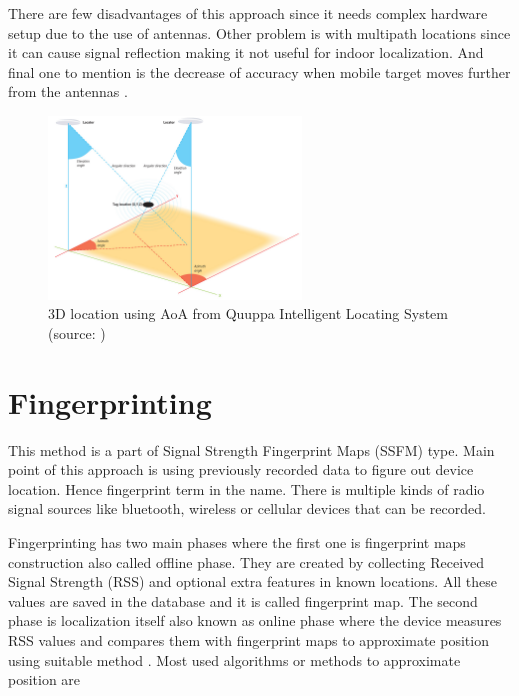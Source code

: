There are few disadvantages of this approach since it needs complex hardware setup due to the use of antennas. Other problem is with multipath locations since it can cause signal reflection making it not useful for indoor localization. And final one to mention is the decrease of accuracy when mobile target moves further from the antennas \cite{AoA}\cite{RofAoA}.

\begin{figure}[h!]
	\begin{centering}
		\includegraphics[width=0.6\textwidth]{img/angulation}
		\par\end{centering}
	\caption{3D location using AoA from Quuppa Intelligent Locating System (source: \cite{QAoA})\label{fig:AoAQuuppa}}
	\label{fig4}
\end{figure}

\section{Fingerprinting}\label{sec:Fingerprinting}
This method is a part of Signal Strength Fingerprint Maps (SSFM) type. Main point of this approach is using previously recorded data to figure out device location. Hence fingerprint term in the name. There is multiple kinds of radio signal sources like bluetooth, wireless or cellular devices that can be recorded.

Fingerprinting has two main phases where the first one is fingerprint maps construction also called offline phase. They are created by collecting Received Signal Strength (RSS) and optional extra features in known locations. All these values are saved in the database and it is called fingerprint map. The second phase is localization itself also known as online phase where the device measures RSS values and compares them with fingerprint maps to approximate position using suitable method \cite{LocalizationApproaches}\cite{ILWTP}. Most used algorithms or methods to approximate position are \cite{IILUBLEB}

